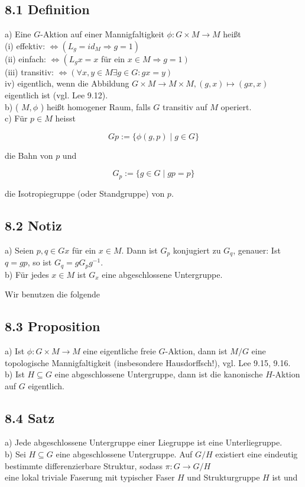 \documentclass[10pt, letterpaper]{article}
\begin{document}
\subsection*{8.1 Definition}
a) Eine $G$-Aktion auf einer Mannigfaltigkeit $\phi: G \times M \rightarrow M$ heißt\\
(i) effektiv: $\Leftrightarrow\left(L_{g}=i d_{M} \Rightarrow g=1\right)$\\
(ii) einfach: $\Leftrightarrow\left(L_{g} x=x\right.$ für ein $\left.x \in M \Rightarrow g=1\right)$\\
(iii) transitiv: $\Leftrightarrow(\forall x, y \in M \exists g \in G: g x=y)$\\
iv) eigentlich, wenn die Abbildung $G \times M \rightarrow M \times M,(g, x) \mapsto(g x, x)$ eigentlich ist (vgl. Lee 9.12).\\
b) ( $M, \phi$ ) heißt homogener Raum, falls $G$ transitiv auf $M$ operiert.\\
c) Für $p \in M$ heisst

$$
G p:=\{\phi(g, p) \mid g \in G\}
$$

die Bahn von $p$ und

$$
G_{p}:=\{g \in G \mid g p=p\}
$$

die Isotropiegruppe (oder Standgruppe) von $p$.

\subsection*{8.2 Notiz}
a) Seien $p, q \in G x$ für ein $x \in M$. Dann ist $G_{p}$ konjugiert zu $G_{q}$, genauer: Ist $q=g p$, so ist $G_{q}=g G_{p} g^{-1}$.\\
b) Für jedes $x \in M$ ist $G_{x}$ eine abgeschlossene Untergruppe.

Wir benutzen die folgende

\subsection*{8.3 Proposition}
a) Ist $\phi: G \times M \rightarrow M$ eine eigentliche freie $G$-Aktion, dann ist $M / G$ eine topologische Mannigfaltigkeit (insbesondere Hausdorffsch!), vgl. Lee 9.15, 9.16.\\
b) Ist $H \subseteq G$ eine abgeschlossene Untergruppe, dann ist die kanonische $H$-Aktion auf $G$ eigentlich.

\subsection*{8.4 Satz}
a) Jede abgeschlossene Untergruppe einer Liegruppe ist eine Unterliegruppe.\\
b) Sei $H \subseteq G$ eine abgeschlossene Untergruppe. Auf $G / H$ existiert eine eindeutig bestimmte differenzierbare Struktur, sodass $\pi: G \rightarrow G / H$\\
eine lokal triviale Faserung mit typischer Faser $H$ und Strukturgruppe $H$ ist und
\end{document}
